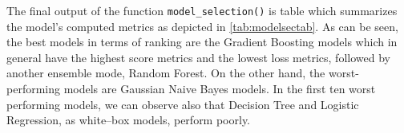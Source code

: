 \newpage

The final output of the function \lstinline{model_selection()} is table which summarizes the model's computed metrics as depicted in \autoref{tab:modelsectab}. As can be seen, the best models in terms of ranking are the Gradient Boosting models which in general have the highest score metrics and the lowest loss metrics, followed by another ensemble mode, Random Forest.
On the other hand, the worst-performing models are Gaussian Naive Bayes models. In the first ten worst performing models, we can observe also that Decision Tree and Logistic Regression, as white--box models, perform poorly.


\clearpage
\newpage

\fancyheadoffset{0pt}




